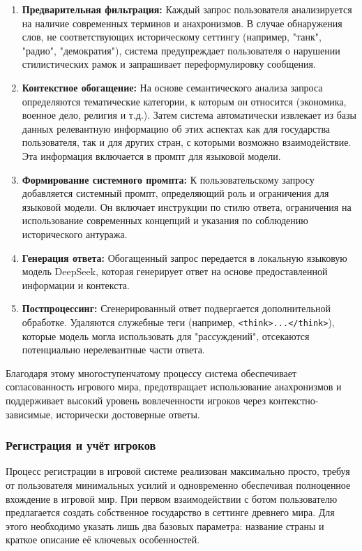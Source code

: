 \begin{enumerate}
\item \textbf{Предварительная фильтрация:} Каждый запрос пользователя анализируется на наличие современных терминов и анахронизмов. В случае обнаружения слов, не соответствующих историческому сеттингу (например, "{}танк"{}, "{}радио"{}, "{}демократия"{}), система предупреждает пользователя о нарушении стилистических рамок и запрашивает переформулировку сообщения.

\item \textbf{Контекстное обогащение:} На основе семантического анализа запроса определяются тематические категории, к которым он относится (экономика, военное дело, религия и т.д.). Затем система автоматически извлекает из базы данных релевантную информацию об этих аспектах как для государства пользователя, так и для других стран, с которыми возможно взаимодействие. Эта информация включается в промпт для языковой модели.

\item \textbf{Формирование системного промпта:} К пользовательскому запросу добавляется системный промпт, определяющий роль и ограничения для языковой модели. Он включает инструкции по стилю ответа, ограничения на использование современных концепций и указания по соблюдению исторического антуража.

\item \textbf{Генерация ответа:} Обогащенный запрос передается в локальную языковую модель DeepSeek, которая генерирует ответ на основе предоставленной информации и контекста.

\item \textbf{Постпроцессинг:} Сгенерированный ответ подвергается дополнительной обработке. Удаляются служебные теги (например, \texttt{<think>...</think>}), которые модель могла использовать для "{}рассуждений"{}, отсекаются потенциально нерелевантные части ответа.
\end{enumerate}

Благодаря этому многоступенчатому процессу система обеспечивает согласованность игрового мира, предотвращает использование анахронизмов и поддерживает высокий уровень вовлеченности игроков через контекстно-зависимые, исторически достоверные ответы.

\subsubsection{Регистрация и учёт игроков}

Процесс регистрации в игровой системе реализован максимально просто, требуя от пользователя минимальных усилий и одновременно обеспечивая полноценное вхождение в игровой мир. При первом взаимодействии с ботом пользователю предлагается создать собственное государство в сеттинге древнего мира. Для этого необходимо указать лишь два базовых параметра: название страны и краткое описание её ключевых особенностей.

